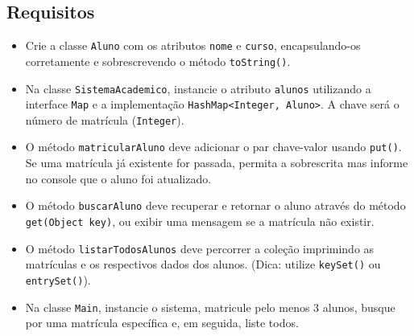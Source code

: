 \documentclass[12pt]{article}
\begin{document}
\begin{center}
\end{center}

\subsection*{Requisitos}
\begin{itemize}
    \item Crie a classe \texttt{Aluno} com os atributos \texttt{nome} e \texttt{curso}, encapsulando-os corretamente e sobrescrevendo o método \texttt{toString()}.
    \item Na classe \texttt{SistemaAcademico}, instancie o atributo \texttt{alunos} utilizando a interface \texttt{Map} e a implementação \texttt{HashMap<Integer, Aluno>}. A chave será o número de matrícula (\texttt{Integer}).
    \item O método \texttt{matricularAluno} deve adicionar o par chave-valor usando \texttt{put()}. Se uma matrícula já existente for passada, permita a sobrescrita mas informe no console que o aluno foi atualizado.
    \item O método \texttt{buscarAluno} deve recuperar e retornar o aluno através do método \texttt{get(Object key)}, ou exibir uma mensagem se a matrícula não existir.
    \item O método \texttt{listarTodosAlunos} deve percorrer a coleção imprimindo as matrículas e os respectivos dados dos alunos. (Dica: utilize \texttt{keySet()} ou \texttt{entrySet()}).
    \item Na classe \texttt{Main}, instancie o sistema, matricule pelo menos 3 alunos, busque por uma matrícula específica e, em seguida, liste todos.
\end{itemize}
\end{document}
